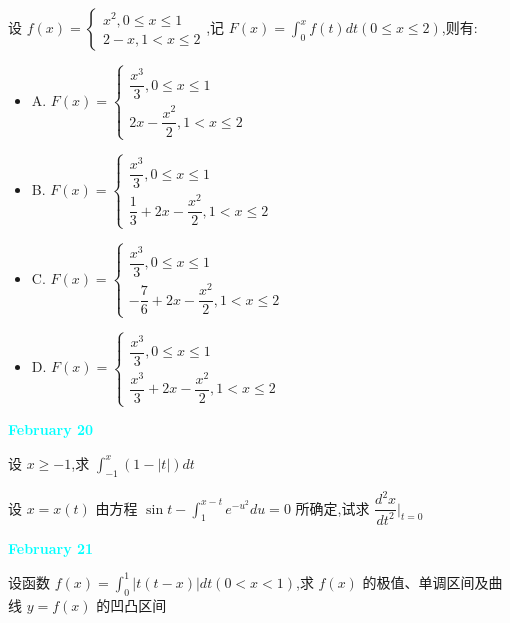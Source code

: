 \begin{example}[][Exam: 28.3.9]
	设 $f(x)=\begin{cases}
		x^{2},0\leq x\leq 1\\2-x, 1<x\leq 2 
	\end{cases}$,记 $F(x)=\int_{0}^{x}f(t)dt(0\leq x\leq 2)$,则有:
	\begin{itemize}
		\item A. $F(x)=\begin{cases}
			\dfrac{x^{3}}{3},0\leq x\leq 1\\
			2x-\dfrac{x^{2}}{2}, 1<x\leq 2
		\end{cases}$
		\item B. $F(x)=\begin{cases}
			\dfrac{x^{3}}{3},0\leq x\leq 1\\
			\dfrac{1}{3}+2x-\dfrac{x^{2}}{2}, 1<x\leq 2
		\end{cases}$
		\item C. $F(x)=\begin{cases}
			\dfrac{x^{3}}{3},0\leq x\leq 1\\
			-\dfrac{7}{6}+2x-\dfrac{x^{2}}{2}, 1<x\leq 2
		\end{cases}$
		\item D. $F(x)=\begin{cases}
			\dfrac{x^{3}}{3},0\leq x\leq 1\\
			\dfrac{x^{3}}{3}+2x-\dfrac{x^{2}}{2}, 1<x\leq 2
		\end{cases}$
	\end{itemize}
\end{example}

\textcolor{cyan}{\textbf{February 20}}

\begin{example}[][Exam: 28.3.10]
	设 $x\geq -1$,求 $\int_{-1}^{x}(1-|t|)dt$
\end{example}

\begin{example}[][Exam: 28.3.11]
	设 $x=x(t)$ 由方程 $\sin t-\int_{1}^{x-t}e^{-u^{2}}du=0$ 所确定,试求 $\dfrac{d^{2}x}{dt^{2}}|_{t=0}$
\end{example}

\textcolor{cyan}{\textbf{February 21}}

\begin{example}[][Exam: 28.3.12]
	设函数 $f(x)=\int_{0}^{1}|t(t-x)|dt(0<x<1)$,求 $f(x)$ 的极值、单调区间及曲线 $y=f(x)$ 的凹凸区间
\end{example}

